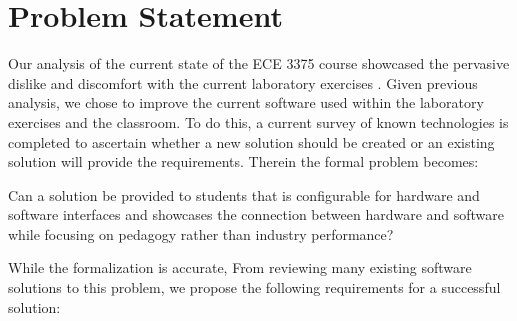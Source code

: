 \section{Problem Statement}
\label{sec:problem-statement}

Our analysis of the current state of the ECE 3375 course showcased the pervasive dislike and discomfort with the current laboratory exercises \cite{evals:ece3375-2013, evals:ece3375-2014}. Given previous analysis, we chose to improve the current software used within the laboratory exercises and the classroom. To do this, a current survey of known technologies is completed to ascertain whether a new solution should be created or an existing solution will provide the requirements. Therein the formal problem becomes: 
\begin{displayquote}
    Can a solution be provided to students that is configurable for hardware and software interfaces and showcases the connection between hardware and software while focusing on pedagogy rather than industry performance? 
\end{displayquote}
While the formalization is accurate,  From reviewing many existing software solutions to this problem, we propose the following requirements for a successful solution:

